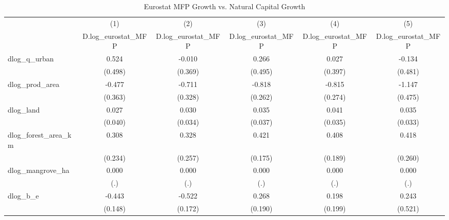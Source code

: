 \begin{table}[htbp]\centering
\def\sym#1{\ifmmode^{#1}\else\(^{#1}\)\fi}
\caption{Eurostat MFP Growth vs. Natural Capital Growth}
\begin{tabular}{l*{5}{c}}
\hline\hline
            &\multicolumn{1}{c}{(1)}&\multicolumn{1}{c}{(2)}&\multicolumn{1}{c}{(3)}&\multicolumn{1}{c}{(4)}&\multicolumn{1}{c}{(5)}\\
            &\multicolumn{1}{c}{D.log\_eurostat\_MFP}&\multicolumn{1}{c}{D.log\_eurostat\_MFP}&\multicolumn{1}{c}{D.log\_eurostat\_MFP}&\multicolumn{1}{c}{D.log\_eurostat\_MFP}&\multicolumn{1}{c}{D.log\_eurostat\_MFP}\\
\hline
dlog\_q\_urban&       0.524       &      -0.010       &       0.266       &       0.027       &      -0.134       \\
            &     (0.498)       &     (0.369)       &     (0.495)       &     (0.397)       &     (0.481)       \\
[1em]
dlog\_prod\_area&      -0.477       &      -0.711       &      -0.818       &      -0.815       &      -1.147       \\
            &     (0.363)       &     (0.328)       &     (0.262)       &     (0.274)       &     (0.475)       \\
[1em]
dlog\_land   &       0.027       &       0.030       &       0.035       &       0.041       &       0.035       \\
            &     (0.040)       &     (0.034)       &     (0.037)       &     (0.035)       &     (0.033)       \\
[1em]
dlog\_forest\_area\_km&       0.308       &       0.328       &       0.421       &       0.408       &       0.418       \\
            &     (0.234)       &     (0.257)       &     (0.175)       &     (0.189)       &     (0.260)       \\
[1em]
dlog\_mangrove\_ha&       0.000       &       0.000       &       0.000       &       0.000       &       0.000       \\
            &         (.)       &         (.)       &         (.)       &         (.)       &         (.)       \\
[1em]
dlog\_b\_e    &      -0.443       &      -0.522       &       0.268       &       0.198       &       0.243       \\
            &     (0.148)       &     (0.172)       &     (0.190)       &     (0.199)       &     (0.521)       \\

\end{tabular}
\end{table}
